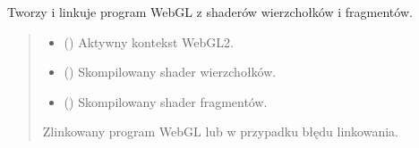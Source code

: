 \documentclass[a4paper,10pt,openany,english]{sphinxmanual}
\begin{document}

\begin{fulllineitems}
\label{\detokenize{js/js-functions:createProgram}}
\pysigstartsignatures
\pysiglinewithargsret
{}
{\sphinxparamcomma {}\sphinxparamcomma {}}
{}
\pysigstopsignatures
\sphinxAtStartPar
Tworzy i linkuje program WebGL z shaderów wierzchołków i fragmentów.
\begin{quote}\begin{description}
\begin{itemize}
\item {} 
\sphinxAtStartPar
{} () \textendash{} Aktywny kontekst WebGL2.

\item {} 
\sphinxAtStartPar
{} () \textendash{} Skompilowany shader wierzchołków.

\item {} 
\sphinxAtStartPar
{} () \textendash{} Skompilowany shader fragmentów.

\end{itemize}

\sphinxAtStartPar
{} \textendash{} \sphinxhyphen{} Zlinkowany program WebGL lub  w przypadku błędu linkowania.

\end{description}\end{quote}

\end{fulllineitems}

\end{document}
